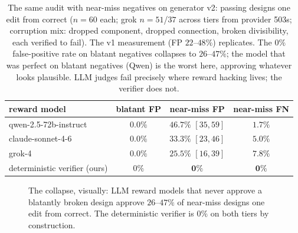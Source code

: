 \documentclass[11pt]{article}
\begin{document}
\begin{table}[t]
\centering\small
\begin{tabular}{lccc}
\toprule
reward model & blatant FP & near-miss FP & near-miss FN \\
\midrule
qwen-2.5-72b-instruct & $0.0\%$ & $\mathbf{46.7\%}$ $[35,59]$ & $1.7\%$ \\
claude-sonnet-4-6 & $0.0\%$ & $33.3\%$ $[23,46]$ & $5.0\%$ \\
grok-4 & $0.0\%$ & $25.5\%$ $[16,39]$ & $7.8\%$ \\
\midrule
deterministic verifier (ours) & $0\%$ & $\mathbf{0\%}$ & $\mathbf{0\%}$ \\
\bottomrule
\end{tabular}
\caption{The same audit with near-miss negatives on generator v2: passing designs one edit from correct ($n{=}60$ each; grok $n{=}51$/$37$ across tiers from provider 503s; corruption mix: dropped component, dropped connection, broken divisibility, each verified to fail). The v1 measurement (FP $22$--$48\%$) replicates. The $0\%$ false-positive rate on blatant negatives collapses to $26$--$47\%$; the model that was perfect on blatant negatives (Qwen) is the worst here, approving whatever looks plausible. LLM judges fail precisely where reward hacking lives; the verifier does not.}
\label{tab:nearmiss}
\end{table}

\begin{figure}[t]
\centering
{}
\caption{The collapse, visually: LLM reward models that never approve a blatantly broken design approve $26$--$47\%$ of near-miss designs one edit from correct. The deterministic verifier is $0\%$ on both tiers by construction.}
\label{fig:nearmiss}
\end{figure}
\end{document}
